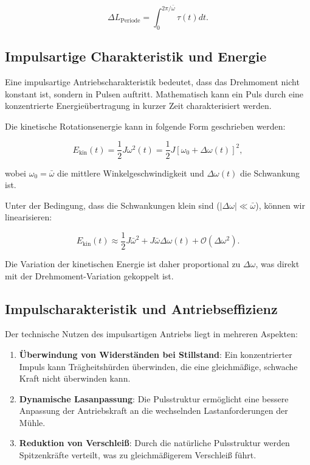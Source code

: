 \documentclass[a4paper,12pt]{article}
\theoremstyle{definition}
\begin{document}
\begin{equation}
  \Delta L_\text{Periode} = \int_0^{2\pi/\bar{\omega}} \tau(t) dt.
  \label{eq:delta_l_periode}
\end{equation}

\subsection{Impulsartige Charakteristik und Energie}

Eine impulsartige Antriebscharakteristik bedeutet, dass das Drehmoment nicht konstant ist, sondern in Pulsen auftritt. Mathematisch kann ein Puls durch eine konzentrierte Energieübertragung in kurzer Zeit charakterisiert werden.

Die kinetische Rotationsenergie kann in folgende Form geschrieben werden:

\begin{equation}
  E_\text{kin}(t) = \frac{1}{2}J\omega^2(t) = \frac{1}{2}J[\omega_0 + \Delta\omega(t)]^2,
  \label{eq:ekin_mit_delta}
\end{equation}

\noindent
wobei $\omega_0 = \bar{\omega}$ die mittlere Winkelgeschwindigkeit und $\Delta\omega(t)$ die Schwankung ist.

Unter der Bedingung, dass die Schwankungen klein sind ($|\Delta\omega| \ll \bar{\omega}$), können wir linearisieren:

\begin{equation}
  E_\text{kin}(t) \approx \frac{1}{2}J\bar{\omega}^2 + J\bar{\omega}\Delta\omega(t) + \mathcal{O}(\Delta\omega^2).
  \label{eq:ekin_linearisiert}
\end{equation}

Die Variation der kinetischen Energie ist daher proportional zu $\Delta\omega$, was direkt mit der Drehmoment-Variation gekoppelt ist.

\subsection{Impulscharakteristik und Antriebseffizienz}

Der technische Nutzen des impulsartigen Antriebs liegt in mehreren Aspekten:

\begin{enumerate}
  \item \textbf{Überwindung von Widerständen bei Stillstand}: Ein konzentrierter Impuls kann Trägheitshürden überwinden, die eine gleichmäßige, schwache Kraft nicht überwinden kann.
  
  \item \textbf{Dynamische Lasanpassung}: Die Pulsstruktur ermöglicht eine bessere Anpassung der Antriebskraft an die wechselnden Lastanforderungen der Mühle.
  
  \item \textbf{Reduktion von Verschleiß}: Durch die natürliche Pulsstruktur werden Spitzenkräfte verteilt, was zu gleichmäßigerem Verschleiß führt.
\end{enumerate}
\end{document}
